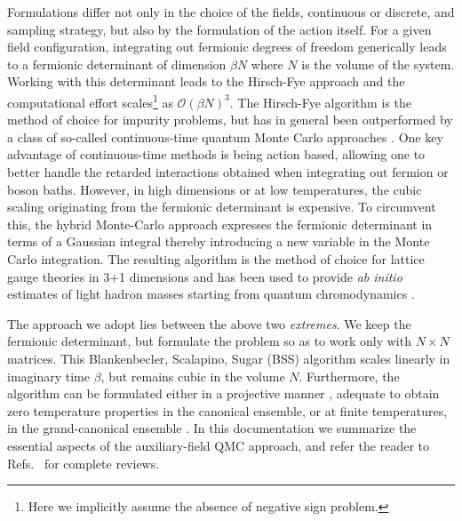 Formulations differ not only in the choice of the fields, continuous or discrete, and sampling strategy, but also by the formulation of the action itself.
For a given field configuration, integrating out fermionic degrees of freedom generically leads to a fermionic determinant of dimension $\beta N$ where $N$ is the volume of the system.  Working  with this determinant leads to the  Hirsch-Fye approach \cite{HirschFye86}  and the computational effort scales\footnote{Here we implicitly assume the absence of negative sign problem.} as $\mathcal{O}\left( \beta N \right)^3$. The Hirsch-Fye  algorithm is the method of choice for impurity problems, but has  in general been outperformed by a class of so-called continuous-time quantum Monte Carlo approaches  
\cite{Gull_rev,Assaad14_rev, Assaad07}.  One key advantage of continuous-time methods is being action based, allowing one to better handle the retarded interactions obtained when integrating out fermion or boson baths. However, in high dimensions or at low temperatures, the cubic scaling originating from the fermionic determinant is expensive. To circumvent this, the hybrid Monte-Carlo approach  \cite{Scalettar86,Duane87,Beyl17}  expresses the fermionic determinant in terms of a Gaussian integral thereby introducing a new variable in the Monte Carlo integration.    The resulting algorithm is the method of choice for lattice gauge theories in 3+1 dimensions   and has been used to provide \emph{ab initio} estimates of light hadron masses starting from quantum chromodynamics \cite{Durr08}.

The approach we adopt lies between the above two \emph{extremes}.  We keep the fermionic determinant, but formulate  the problem so as to  work only with $N\times N$ matrices.    This 
Blankenbecler,  Scalapino, Sugar (BSS)  algorithm scales linearly in  imaginary time $\beta$, but remains cubic in the volume $N$.    Furthermore, the algorithm can be formulated either in a projective manner \cite{Sugiyama86,Sorella89},  adequate to obtain zero temperature properties in the  canonical ensemble,  or at finite temperatures, in the  grand-canonical ensemble \cite{White89}.
In this documentation we summarize the essential aspects of the auxiliary-field QMC approach, and refer the reader to Refs.~\cite{Assaad02,Assaad08_rev} for complete reviews. 


